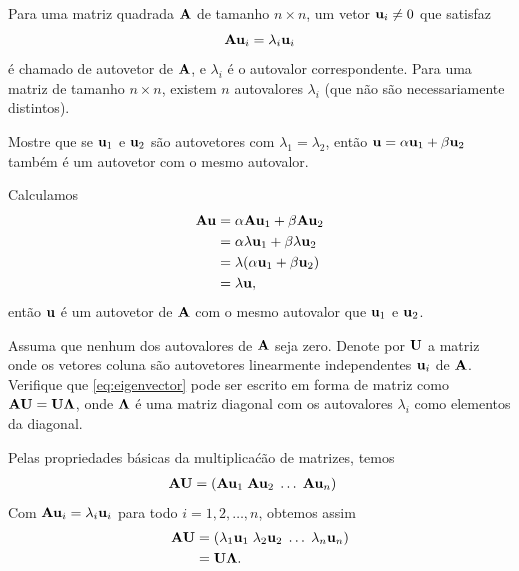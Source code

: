 \label{ex:eigenvalue-decomposition}
Para uma matriz quadrada $\mathbf{A}$ de tamanho $n \times n$, um vetor $\mathbf{u}_i
\neq 0$ que satisfaz
\begin{equation}
    \mathbf{A}\mathbf{u}_i = \lambda_i \mathbf{u}_i
    \label{eq:eigenvector}
\end{equation}
\'e chamado de autovetor de $\mathbf{A}$, e $\lambda_i$ \'e o autovalor correspondente.
Para uma matriz de tamanho $n \times n$, existem $n$
autovalores $\lambda_i$ (que n\~ao s\~ao necessariamente distintos).
\begin{exenumerate}
    \item Mostre que se $\mathbf{u}_1$ e $\mathbf{u}_2$ s\~ao autovetores com $\lambda_1=\lambda_2$, ent\~ao
    $\mathbf{u} = \alpha \mathbf{u}_1 +\beta \mathbf{u}_2$ tamb\'em \'e um autovetor com o mesmo autovalor.
    \begin{solution}
        Calculamos
        \begin{align}
            \mathbf{A}\mathbf{u} &= \alpha \mathbf{A}\mathbf{u}_1 + \beta \mathbf{A}\mathbf{u}_2 \\
            &= \alpha \lambda \mathbf{u}_1 + \beta \lambda \mathbf{u}_2 \\
            &= \lambda(\alpha\mathbf{u}_1 + \beta\mathbf{u}_2) \\
            &= \lambda \mathbf{u},
        \end{align}
        ent\~ao $\mathbf{u}$ \'e um autovetor de $\mathbf{A}$ com o mesmo autovalor que $\mathbf{u}_1$ e $\mathbf{u}_2$.
    \end{solution}
    
    \item Assuma que nenhum dos autovalores de $\mathbf{A}$ seja zero. Denote por $\mathbf{U}$
    a matriz onde os vetores coluna s\~ao autovetores linearmente independentes
    $\mathbf{u}_i$ de $\mathbf{A}$. Verifique que \eqref{eq:eigenvector} pode ser escrito em forma de matriz como $\mathbf{A}\mathbf{U}=\mathbf{U}\mathbf{\Lambda}$, onde $\mathbf{\Lambda}$ \'e uma
    matriz diagonal com os autovalores $\lambda_i$ como elementos da diagonal.
    
    \begin{solution}
        Pelas propriedades b\'asicas da multiplica\'c\~ao de matrizes, temos
        \begin{align}
            \mathbf{A}\mathbf{U} &= (\mathbf{A}\mathbf{u}_1 \; \mathbf{A}\mathbf{u}_2 \;\ldots \; \mathbf{A}\mathbf{u}_n)
        \end{align}
        Com $\mathbf{A}\mathbf{u}_i = \lambda_i \mathbf{u}_i$ para todo $i = 1, 2, \ldots, n$, obtemos assim
        \begin{align}
            \mathbf{A}\mathbf{U} & = (\lambda_1\mathbf{u}_1 \; \lambda_2\mathbf{u}_2 \;\ldots \; \lambda_n\mathbf{u}_n) \\
            &= \mathbf{U}\mathbf{\Lambda}.
        \end{align}
    \end{solution}
    

\end{exenumerate}
